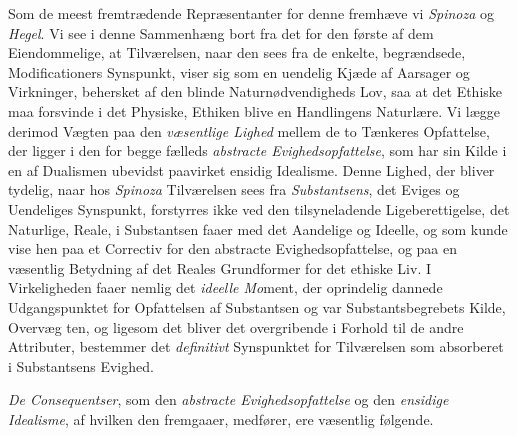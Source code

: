 Som de meest fremtrædende Repræsentanter for denne fremhæve vi \emph{Spinoza} og
\emph{Hegel}. Vi see i denne Sammenhæng bort fra det for den første af dem
Eiendommelige, at Tilværelsen, naar den sees fra de enkelte, begrændsede,
Modificationers Synspunkt, viser sig som en uendelig Kjæde af Aarsager og
Virkninger, behersket af den blinde Naturnødvendigheds Lov, saa at det Ethiske
maa forsvinde i det Physiske, Ethiken blive en Handlingens Naturlære. Vi lægge
derimod Vægten paa den \emph{væsentlige Lighed} mellem de to Tænkeres
Opfattelse, der ligger i den for begge fælleds \emph{abstracte
Evighedsopfattelse}, som har sin Kilde i en af Dualismen ubevidst paavirket
ensidig Idealisme. Denne Lighed, der bliver tydelig, naar hos \emph{Spinoza}
Tilværelsen sees fra \emph{Substantsens}, det Eviges og Uendeliges Synspunkt,
forstyrres ikke ved den tilsyneladende Ligeberettigelse, det Naturlige, Reale, i
Substantsen faaer med det Aandelige og Ideelle, og som kunde vise hen paa et
Correctiv for den abstracte Evighedsopfattelse, og paa en væsentlig Betydning af
det Reales Grundformer for det ethiske Liv. I Virkeligheden faaer nemlig det
\emph{ideelle Mo}ment, der oprindelig dannede Udgangspunktet for Opfattelsen af
Substantsen og var Substantsbegrebets Kilde, Overvæg\-%
\setcounter{footnote}{0}%
ten, og ligesom det bliver det overgribende i Forhold til de andre Attributer,
bestemmer det \emph{definitivt} Synspunktet for Tilværelsen som absorberet i
Substantsens Evighed.

\emph{De Consequentser}, som den \emph{abstracte Evighedsopfattelse} og den
\emph{ensidige Idealisme}, af hvilken den fremgaaer, medfører, ere væsentlig
følgende.

